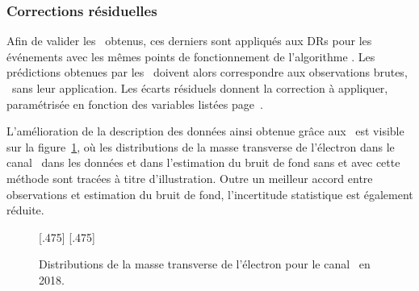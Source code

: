 \subsubsection{Corrections résiduelles}
Afin de valider les \fakefactors\ obtenus, ces derniers sont appliqués aux DRs pour les événements avec les mêmes points de fonctionnement de l'algorithme \DEEPTAU.
Les prédictions obtenues par les \fakefactors\ doivent alors correspondre aux observations brutes, \ie\ sans leur application.
Les écarts résiduels donnent la correction à appliquer, paramétrisée en fonction des variables listées page~\pageref{eq-FF_CQ_def}.
\bigskip
\par
L'amélioration de la description des données ainsi obtenue grâce aux \fakefactors\ est visible sur la figure~\ref{fig-chapter-HTT_analysis-section-bg_estimation-FF_method-2018et_mT1_illustration}, où les distributions de la masse transverse de l'électron dans le canal \ele\tauh\ dans les données et dans l'estimation du bruit de fond sans et avec cette méthode sont tracées à titre d'illustration.
Outre un meilleur accord entre observations et estimation du bruit de fond, l'incertitude statistique est également réduite.
\begin{figure}[h]
\centering

[.475\textwidth]
{}
\hfill
{}[.475\textwidth]
{}

\caption{Distributions de la masse transverse de l'électron pour le canal \ele\tauh\ en 2018.}
\label{fig-chapter-HTT_analysis-section-bg_estimation-FF_method-2018et_mT1_illustration}
\end{figure}